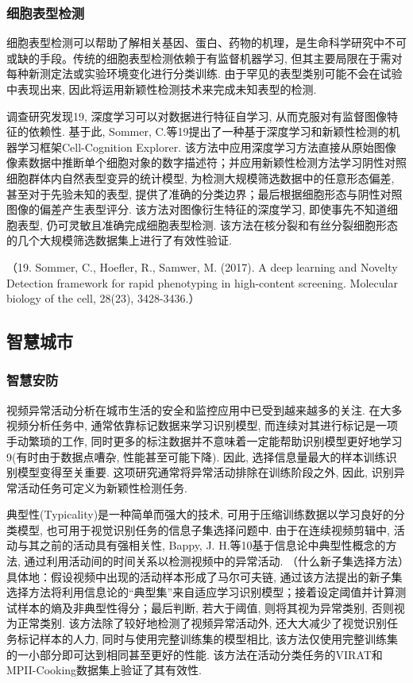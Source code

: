 \documentclass{Style/aas}
\begin{document}
\begin{multicols}{2}
  \subsubsection{细胞表型检测}
  细胞表型检测可以帮助了解相关基因、蛋白、药物的机理，是生命科学研究中不可或缺的手段。传统的细胞表型检测依赖于有监督机器学习, 但其主要局限在于需对每种新测定法或实验环境变化进行分类训练. 由于罕见的表型类别可能不会在试验中表现出来, 因此将运用新颖性检测技术来完成未知表型的检测.

  调查研究发现19, 深度学习可以对数据进行特征自学习, 从而克服对有监督图像特征的依赖性. 基于此, Sommer, C.等19提出了一种基于深度学习和新颖性检测的机器学习框架Cell-Cognition Explorer. 该方法中应用深度学习方法直接从原始图像像素数据中推断单个细胞对象的数字描述符；并应用新颖性检测方法学习阴性对照细胞群体内自然表型变异的统计模型, 为检测大规模筛选数据中的任意形态偏差, 甚至对于先验未知的表型, 提供了准确的分类边界；最后根据细胞形态与阴性对照图像的偏差产生表型评分. 该方法对图像衍生特征的深度学习, 即使事先不知道细胞表型, 仍可灵敏且准确完成细胞表型检测. 该方法在核分裂和有丝分裂细胞形态的几个大规模筛选数据集上进行了有效性验证.

  （19.	Sommer, C., Hoefler, R., Samwer, M. (2017). A deep learning and Novelty Detection framework for rapid phenotyping in high-content screening. Molecular biology of the cell, 28(23), 3428-3436.）

  \subsection{智慧城市}
  \subsubsection{智慧安防}
  视频异常活动分析在城市生活的安全和监控应用中已受到越来越多的关注. 在大多视频分析任务中, 通常依靠标记数据来学习识别模型, 而连续对其进行标记是一项手动繁琐的工作, 同时更多的标注数据并不意味着一定能帮助识别模型更好地学习9(有时由于数据点嘈杂, 性能甚至可能下降). 因此, 选择信息量最大的样本训练识别模型变得至关重要. 这项研究通常将异常活动排除在训练阶段之外, 因此, 识别异常活动任务可定义为新颖性检测任务.

  典型性(Typicality)是一种简单而强大的技术, 可用于压缩训练数据以学习良好的分类模型, 也可用于视觉识别任务的信息子集选择问题中. 由于在连续视频剪辑中, 活动与其之前的活动具有强相关性, Bappy, J. H.等10基于信息论中典型性概念的方法, 通过利用活动间的时间关系以检测视频中的异常活动. （什么新子集选择方法）具体地：假设视频中出现的活动样本形成了马尔可夫链, 通过该方法提出的新子集选择方法将利用信息论的“典型集”来自适应学习识别模型；接着设定阈值并计算测试样本的熵及非典型性得分；最后判断, 若大于阈值, 则将其视为异常类别, 否则视为正常类别. 该方法除了较好地检测了视频异常活动外, 还大大减少了视觉识别任务标记样本的人力, 同时与使用完整训练集的模型相比, 该方法仅使用完整训练集的一小部分即可达到相同甚至更好的性能. 该方法在活动分类任务的VIRAT和MPII-Cooking数据集上验证了其有效性.


\end{multicols}
\end{document}
